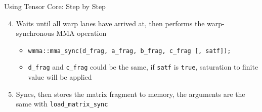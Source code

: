 \documentclass[dvipdfmx, 11pt, aspectratio=169]{beamer}   %
\begin{document}
\begin{frame}[fragile]{Using Tensor Core: Step by Step}
\begin{enumerate}\setcounter{enumi}{3}
  \item Waits until all warp lanes have arrived at, then performs the warp-synchronous MMA operation
  \begin{itemize}
    \item \lstinline|wmma::mma_sync(d_frag, a_frag, b_frag, c_frag [, satf]);|
    \item \lstinline|d_frag| and \lstinline|c_frag| could be the same, if \lstinline|satf| is \lstinline|true|, saturation to finite value will be applied
  \end{itemize}
  \item Syncs, then stores the matrix fragment to memory, the arguments are the same with \lstinline|load_matrix_sync|
\end{enumerate}
\end{frame}
\end{document}
